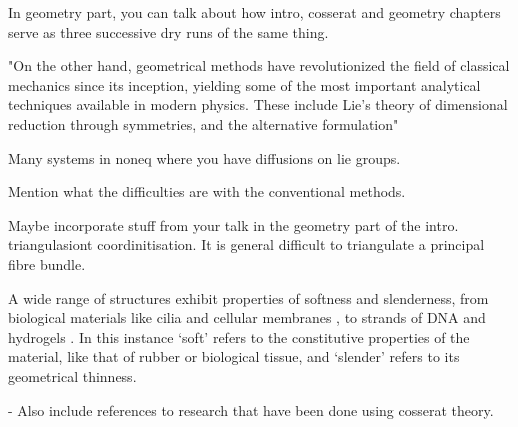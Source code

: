 \documentclass[]{cam-thesis}
\begin{document}
In geometry part, you can talk about how intro, cosserat and geometry chapters serve as three successive dry runs of the same thing.

"On the other hand, geometrical methods have revolutionized the field of classical
mechanics since its inception, yielding some of the most important analytical techniques
available in modern physics. These include Lie’s theory of dimensional reduction through
symmetries, and the alternative formulation"



Many systems in noneq where you have diffusions on lie groups.

Mention what the difficulties are with the conventional methods.

Maybe incorporate stuff from your talk in the geometry part of the intro. triangulasiont coordinitisation. It is general difficult to triangulate a principal fibre bundle.




A wide range of structures exhibit properties of softness and slenderness, from biological materials like cilia \citep{guMagneticCiliaCarpets2020} and cellular membranes \citep{krishnaswamyCosserattypeModelRed1996}, to strands of DNA \citep{corazzaUnravelingLoopingEfficiency2022} and hydrogels \citep{rajanMechanicsViscoelasticBuckling2019}. In this instance `soft' refers to the constitutive properties of the material, like that of rubber or biological tissue, and `slender' refers to its geometrical thinness.

- Also include references to research that have been done using cosserat theory.

\end{document}
